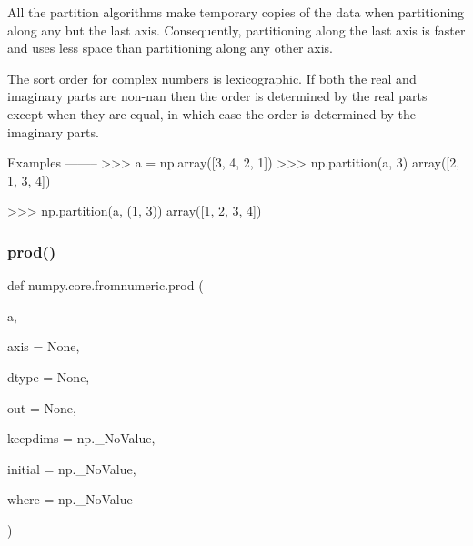 \begin{DoxyVerb}
All the partition algorithms make temporary copies of the data when
partitioning along any but the last axis.  Consequently,
partitioning along the last axis is faster and uses less space than
partitioning along any other axis.

The sort order for complex numbers is lexicographic. If both the
real and imaginary parts are non-nan then the order is determined by
the real parts except when they are equal, in which case the order
is determined by the imaginary parts.

Examples
--------
>>> a = np.array([3, 4, 2, 1])
>>> np.partition(a, 3)
array([2, 1, 3, 4])

>>> np.partition(a, (1, 3))
array([1, 2, 3, 4])\end{DoxyVerb}
 \mbox{\label{namespacenumpy_1_1core_1_1fromnumeric_a581dd0c99549f980c18b4584eb416fb5}} 
\subsubsection{\texorpdfstring{prod()}{prod()}}
{\footnotesize\ttfamily def numpy.\+core.\+fromnumeric.\+prod (\begin{DoxyParamCaption}\item[{}]{a,  }\item[{}]{axis = {\ttfamily None},  }\item[{}]{dtype = {\ttfamily None},  }\item[{}]{out = {\ttfamily None},  }\item[{}]{keepdims = {\ttfamily np.\+\_\+NoValue},  }\item[{}]{initial = {\ttfamily np.\+\_\+NoValue},  }\item[{}]{where = {\ttfamily np.\+\_\+NoValue} }\end{DoxyParamCaption})}

